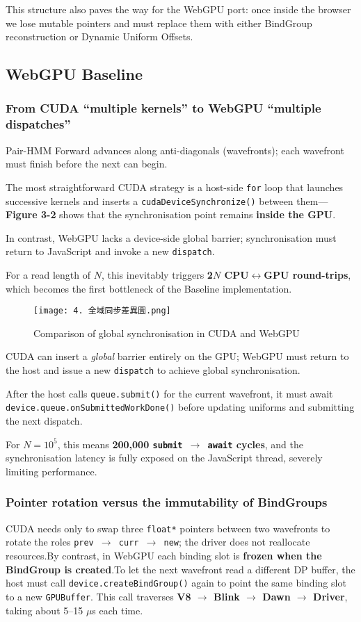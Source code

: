 \documentclass[PhD]{PHlab-thesis}
\begin{document}
This structure also paves the way for the WebGPU port: once inside the browser we lose mutable pointers and must replace them with either BindGroup reconstruction or Dynamic Uniform Offsets.

\subsection{WebGPU Baseline}
\subsubsection{From CUDA ``multiple kernels'' to WebGPU ``multiple dispatches''}
Pair-HMM Forward advances along anti-diagonals (wavefronts); each wavefront must finish before the next can begin.

The most straightforward CUDA strategy is a host-side \texttt{for} loop that launches successive kernels and inserts a \texttt{cudaDeviceSynchronize()} between them—\textbf{Figure 3-2} shows that the synchronisation point remains \textbf{inside the GPU}.

In contrast, WebGPU lacks a device-side global barrier; synchronisation must return to JavaScript and invoke a new \texttt{dispatch}.

For a read length of $N$, this inevitably triggers \textbf{2$N$ CPU$\leftrightarrow$GPU round-trips}, which becomes the first bottleneck of the Baseline implementation.

\begin{figure}[htbp]
    \centering
    \texttt{[image: 4. 全域同步差異圖.png]}
    \caption{Comparison of global synchronisation in CUDA and WebGPU}
    \label{fig:global-sync-diff}
\end{figure}


CUDA can insert a \emph{global} barrier entirely on the GPU; WebGPU must return to the host and issue a new \texttt{dispatch} to achieve global synchronisation.

After the host calls \texttt{queue.submit()} for the current wavefront, it must await \texttt{device.queue.onSubmittedWorkDone()} before updating uniforms and submitting the next dispatch.

For $N=10^5$, this means \textbf{200,000 \texttt{submit $\rightarrow$ await} cycles}, and the synchronisation latency is fully exposed on the JavaScript thread, severely limiting performance.

\subsubsection{Pointer rotation versus the immutability of BindGroups}
CUDA needs only to swap three \texttt{float*} pointers between two wavefronts to rotate the roles \texttt{prev $\rightarrow$ curr $\rightarrow$ new}; the driver does not reallocate resources.By contrast, in WebGPU each binding slot is \textbf{frozen when the BindGroup is created}.To let the next wavefront read a different DP buffer, the host must call \texttt{device.createBindGroup()} again to point the same binding slot to a new \texttt{GPUBuffer}.
This call traverses \textbf{V8 $\rightarrow$ Blink $\rightarrow$ Dawn $\rightarrow$ Driver}, taking about 5–15 $\mu$s each time.
\end{document}
